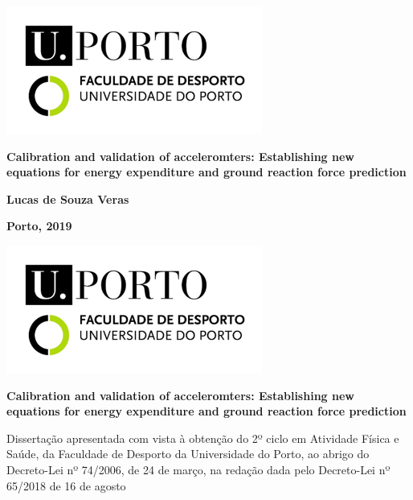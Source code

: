 \documentclass[12pt]{article}
\def\blankpage{%
      \clearpage%
      \thispagestyle{empty}%
      \addtocounter{page}{+0}%
      \null%
      \clearpage}
\begin{document}

\begin{center}
\includegraphics[width=\columnwidth]{figs/UPorto.png}

\vspace{6em}

\textbf{\Large Calibration and validation of acceleromters: Establishing new equations for energy expenditure and ground reaction force prediction}

\vspace{\fill}

\textbf{Lucas de Souza Veras}

\medskip

\textbf{Porto, 2019}
\end{center}

\thispagestyle{empty}
\blankpage

\begin{center}
\includegraphics{figs/UPorto.png}


\vspace{4em}

\Large \textbf{Calibration and validation of acceleromters: Establishing new equations for energy expenditure and ground reaction force prediction}
\end{center}

\vspace{6em}

\begingroup
\setlength{\leftskip}{3.75cm} \noindent Dissertação apresentada com vista à obtenção do 2º ciclo em Atividade Física e Saúde, da Faculdade de Desporto da Universidade do Porto, ao abrigo do Decreto-Lei nº 74/2006, de 24 de março, na redação dada pelo Decreto-Lei nº 65/2018 de 16 de agosto
\par
\endgroup
\end{document}
